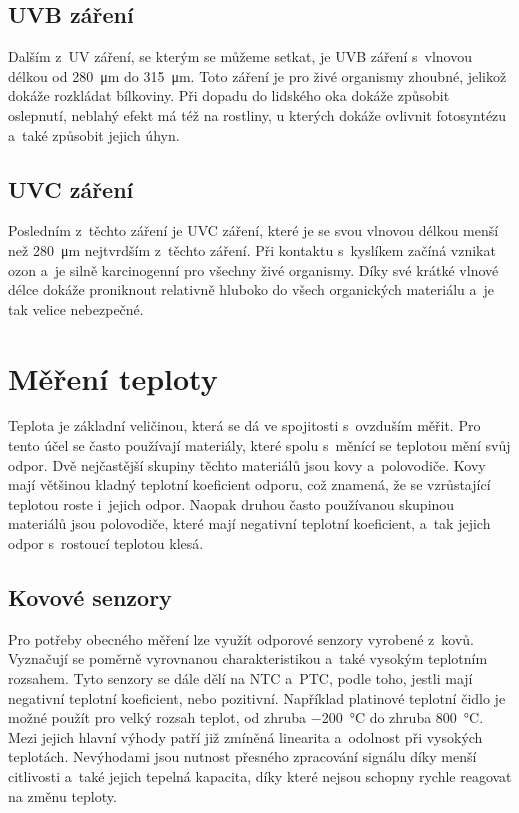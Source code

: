 \subsection{UVB záření}

Dalším z~UV záření, se kterým se můžeme setkat, je UVB záření s~vlnovou délkou od \SI{280}{\micro\metre} do \SI{315}{\micro\metre}. Toto záření je pro živé organismy zhoubné, jelikož dokáže rozkládat bílkoviny. Při dopadu do lidského oka dokáže způsobit oslepnutí, neblahý efekt má též na rostliny, u kterých dokáže ovlivnit fotosyntézu a~také způsobit jejich úhyn.

\subsection{UVC záření}

Posledním z~těchto záření je UVC záření, které je se svou vlnovou délkou menší než \SI{280}{\micro\metre} nejtvrdším z~těchto záření. Při kontaktu s~kyslíkem začíná vznikat ozon a~je silně karcinogenní pro všechny živé organismy. Díky své krátké vlnové délce dokáže proniknout relativně hluboko do všech organických materiálu a~je tak velice nebezpečné.

\section{Měření teploty}

Teplota je základní veličinou, která se dá ve spojitosti s~ovzduším měřit. Pro tento účel se často používají materiály, které spolu s~měnící se teplotou mění svůj odpor. Dvě nejčastější skupiny těchto materiálů jsou kovy a~polovodiče. Kovy mají většinou kladný teplotní koeficient odporu, což znamená, že se vzrůstající teplotou roste i~jejich odpor. Naopak druhou často používanou skupinou materiálů jsou polovodiče, které mají negativní teplotní koeficient, a~tak jejich odpor s~rostoucí teplotou klesá.

\subsection{Kovové senzory}

Pro potřeby obecného měření lze využít odporové senzory vyrobené z~kovů. Vyznačují se poměrně vyrovnanou charakteristikou a~také vysokým teplotním rozsahem. Tyto senzory se dále dělí na NTC a~PTC, podle toho, jestli mají negativní teplotní koeficient, nebo pozitivní. Například platinové teplotní čidlo je možné použít pro velký rozsah teplot, od zhruba \SI{-200}{\celsius} do zhruba \SI{800}{\celsius}. Mezi jejich hlavní výhody patří již zmíněná linearita a~odolnost při vysokých teplotách. Nevýhodami jsou nutnost přesného zpracování signálu díky menší citlivosti a~také jejich tepelná kapacita, díky které nejsou schopny rychle reagovat na změnu teploty.

